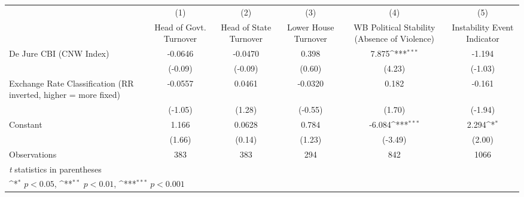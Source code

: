 {
\def\sym#1{\ifmmode^{#1}\else\(^{#1}\)\fi}
\begin{tabular*}{\linewidth}{@{\hskip\tabcolsep\extracolsep\fill}l*{5}{c}}
\toprule
                &\multicolumn{1}{c}{(1)}&\multicolumn{1}{c}{(2)}&\multicolumn{1}{c}{(3)}&\multicolumn{1}{c}{(4)}&\multicolumn{1}{c}{(5)}\\
                &\multicolumn{1}{c}{Head of Govt. Turnover}&\multicolumn{1}{c}{Head of State Turnover}&\multicolumn{1}{c}{Lower House Turnover}&\multicolumn{1}{c}{WB Political Stability (Absence of Violence)}&\multicolumn{1}{c}{Instability Event Indicator}\\
\midrule
De Jure CBI (CNW Index)&  -0.0646         &  -0.0470         &    0.398         &    7.875\sym{***}&   -1.194         \\
                &  (-0.09)         &  (-0.09)         &   (0.60)         &   (4.23)         &  (-1.03)         \\
\addlinespace
Exchange Rate Classification (RR inverted, higher = more fixed)&  -0.0557         &   0.0461         &  -0.0320         &    0.182         &   -0.161         \\
                &  (-1.05)         &   (1.28)         &  (-0.55)         &   (1.70)         &  (-1.94)         \\
\addlinespace
Constant        &    1.166         &   0.0628         &    0.784         &   -6.084\sym{***}&    2.294\sym{*}  \\
                &   (1.66)         &   (0.14)         &   (1.23)         &  (-3.49)         &   (2.00)         \\
\midrule
Observations    &      383         &      383         &      294         &      842         &     1066         \\
\bottomrule
\multicolumn{6}{l}{\footnotesize \textit{t} statistics in parentheses}\\
\multicolumn{6}{l}{\footnotesize \sym{*} \(p<0.05\), \sym{**} \(p<0.01\), \sym{***} \(p<0.001\)}\\
\end{tabular*}
}
